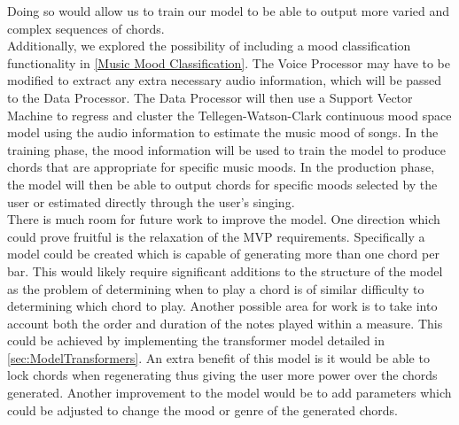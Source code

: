 Doing so would allow us to train our model to be able to output more varied and complex sequences of chords.
\\
Additionally, we explored the possibility of including a mood classification functionality in \cref{Music Mood Classification}. 
The Voice Processor may have to be modified to extract any extra necessary audio information, which will be passed to the Data Processor. 
The Data Processor will then use a Support Vector Machine to regress and cluster the Tellegen-Watson-Clark continuous mood space model using the audio information to estimate the music mood of songs. 
In the training phase, the mood information will be used to train the model to produce chords that are appropriate for specific music moods. 
In the production phase, the model will then be able to output chords for specific moods selected by the user or estimated directly through the user's singing.
\\
There is much room for future work to improve the model.
One direction which could prove fruitful is the relaxation of the MVP requirements. 
Specifically a model could be created which is capable of generating more than one chord per bar.
This would likely require significant additions to the structure of the model as the problem of determining when to play a chord is of similar difficulty to determining which chord to play.
Another possible area for work is to take into account both the order and duration of the notes played within a measure.
This could be achieved by implementing the transformer model detailed in \cref{sec:ModelTransformers}.
An extra benefit of this model is it would be able to lock chords when regenerating thus giving the user more power over the chords generated.
Another improvement to the model would be to add parameters which could be adjusted to change the mood or genre of the generated chords.
\\

